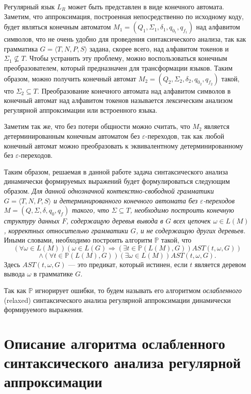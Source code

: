 Регулярный язык $L_R$ может быть представлен в виде конечного автомата. Заметим, что аппроксимация, построенная непосредственно по исходному коду, будет являться конечным автоматом $M_1=(Q_1,\Sigma_1,\delta_1,q_{0_1},q_{f_1})$ над алфавитом символов, что не очень удобно для проведения синтаксического анализа, так как грамматика $G = \langle T, N, P, S \rangle$ задана, скорее всего, над алфавитом токенов и $\Sigma_1 \nsubseteq T$. Чтобы устранить эту проблему, можно воспользоваться конечным преобразователем, который предназначен для трансформации языков. Таким образом, можно получить конечный автомат $M_2=(Q_2,\Sigma_2,\delta_2,q_{0_2},q_{f_2})$ такой, что $\Sigma_2 \subseteq T$. Преобразование конечного автомата над алфавитом символов в конечный автомат над алфавитом токенов называется лексическим анализом регулярной аппроксимации или встроенного языка.

Заметим так же, что без потери общности можно считать, что $M_2$ является детерминированным конечным автоматом без $\varepsilon$-переходов, так как любой конечный автомат можно преобразовать к эквивалентному детерминированному без  $\varepsilon$-переходов.

Таким образом, решаемая в данной работе задача синтаксического анализа динамически формируемых выражений будет формулироваться следующим образом. \textit{ Для данной однозначной контекстно-свободной грамматики $G = \langle T, N, P, S \rangle$ и детерминированного конечного автомата без $\varepsilon$-переходов $M=(Q,\Sigma,\delta,q_0,q_f)$ такого, что $\Sigma \subseteq T$, необходимо построить конечную структуру данных $F$, содержащую деревья вывода в $G$ всех цепочек $\omega \in L(M)$, корректных относительно грамматики $G$, и не содержащую других деревьев. } Иными словами, необходимо построить алгоритм $\mathbb{P}$ такой, что
    $$(\forall \omega \in L(M)) (\omega \in L(G) \Rightarrow (\exists t \in \mathbb{P}(L(M),G))AST(t, \omega, G))$$
    $$\land (\forall t \in \mathbb{P}(L(M),G))(\exists \omega \in L(M))AST(t,\omega,G).$$ 
    Здесь $AST(t,\omega,G)$ --- это предикат, который истинен, если $t$ является деревом вывода $\omega$ в грамматике $G$.


Так как $\mathbb{P}$ игнорирует ошибки, то будем называть его алгоритмом \textit{ослабленного} (relaxed) синтаксического анализа регулярной аппроксимации динамически формируемого выражения.


\section{Описание алгоритма ослабленного синтаксического анализа регулярной аппроксимации}\label{AlgoDescr}

